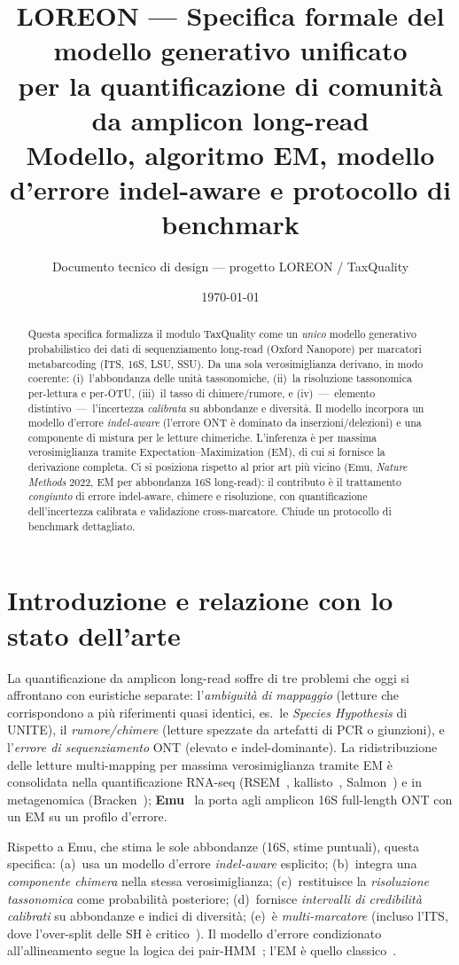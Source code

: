 \documentclass[11pt,a4paper]{article}
\title{\vspace{-1.2cm}\textbf{LOREON --- Specifica formale del modello generativo unificato\\ per la quantificazione di comunità da amplicon long-read}\\[4pt]
\large Modello, algoritmo EM, modello d'errore indel-aware e protocollo di benchmark}
\author{Documento tecnico di design --- progetto LOREON / TaxQuality}
\date{\today}
\begin{document}
\maketitle
\vspace{-0.6cm}

\begin{abstract}
\noindent Questa specifica formalizza il modulo TaxQuality come un \emph{unico} modello generativo probabilistico dei dati di sequenziamento long-read (Oxford Nanopore) per marcatori metabarcoding (ITS, 16S, LSU, SSU). Da una sola verosimiglianza derivano, in modo coerente: (i)~l'abbondanza delle unit\`a tassonomiche, (ii)~la risoluzione tassonomica per-lettura e per-OTU, (iii)~il tasso di chimere/rumore, e (iv)~---~elemento distintivo~---~l'incertezza \emph{calibrata} su abbondanze e diversit\`a. Il modello incorpora un modello d'errore \emph{indel-aware} (l'errore ONT \`e dominato da inserzioni/delezioni) e una componente di mistura per le letture chimeriche. L'inferenza \`e per massima verosimiglianza tramite Expectation--Maximization (EM), di cui si fornisce la derivazione completa. Ci si posiziona rispetto al prior art pi\`u vicino (Emu, \emph{Nature Methods} 2022, EM per abbondanza 16S long-read): il contributo \`e il trattamento \emph{congiunto} di errore indel-aware, chimere e risoluzione, con quantificazione dell'incertezza calibrata e validazione cross-marcatore. Chiude un protocollo di benchmark dettagliato.
\end{abstract}

\section{Introduzione e relazione con lo stato dell'arte}
La quantificazione da amplicon long-read soffre di tre problemi che oggi si affrontano con euristiche separate: l'\emph{ambiguit\`a di mappaggio} (letture che corrispondono a pi\`u riferimenti quasi identici, es.\ le \emph{Species Hypothesis} di UNITE), il \emph{rumore/chimere} (letture spezzate da artefatti di PCR o giunzioni), e l'\emph{errore di sequenziamento} ONT (elevato e indel-dominante). La ridistribuzione delle letture multi-mapping per massima verosimiglianza tramite EM \`e consolidata nella quantificazione RNA-seq (RSEM~\cite{rsem}, kallisto~\cite{kallisto}, Salmon~\cite{salmon}) e in metagenomica (Bracken~\cite{bracken}); \textbf{Emu}~\cite{emu} la porta agli amplicon 16S full-length ONT con un EM su un profilo d'errore.

Rispetto a Emu, che stima le sole abbondanze (16S, stime puntuali), questa specifica: (a)~usa un modello d'errore \emph{indel-aware} esplicito; (b)~integra una \emph{componente chimera} nella stessa verosimiglianza; (c)~restituisce la \emph{risoluzione tassonomica} come probabilit\`a posteriore; (d)~fornisce \emph{intervalli di credibilit\`a calibrati} su abbondanze e indici di diversit\`a; (e)~\`e \emph{multi-marcatore} (incluso l'ITS, dove l'over-split delle SH \`e critico~\cite{koljalg,schoch}). Il modello d'errore condizionato all'allineamento segue la logica dei pair-HMM~\cite{durbin}; l'EM \`e quello classico~\cite{dempster}.
\end{document}
